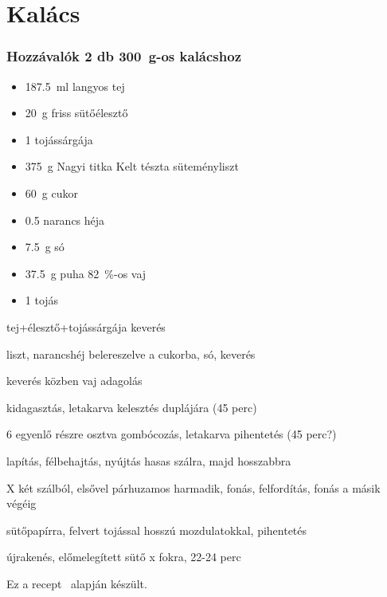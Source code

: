\newpage
\section{Kalács} \label{sec:kalacs}

\subsubsection*{Hozzávalók 2 db \qty{300}{\g}-os kalácshoz}
\begin{itemize}
    \item \qty{187.5}{\ml} langyos tej
    \item \qty{20}{\g} friss sütőélesztő
    \item \num{1} tojássárgája
    \item \qty{375}{\g} Nagyi titka Kelt tészta süteményliszt
    \item \qty{60}{\g} cukor
    \item \num{0.5} narancs héja
    \item \qty{7.5}{\g} só
    \item \qty{37.5}{\g} puha \qty{82}{\percent}-os vaj
    \item \num{1} tojás
\end{itemize}

tej+élesztő+tojássárgája keverés

liszt, narancshéj belereszelve a cukorba, só, keverés

keverés közben vaj adagolás

kidagasztás, letakarva kelesztés duplájára (45 perc)

6 egyenlő részre osztva gombócozás, letakarva pihentetés (45 perc?)

lapítás, félbehajtás, nyújtás hasas szálra, majd hosszabbra

X két szálból, elsővel párhuzamos harmadik, fonás, felfordítás, fonás a másik végéig

sütőpapírra, felvert tojással hosszú mozdulatokkal, pihentetés

újrakenés, előmelegített sütő x fokra, 22-24 perc



Ez a recept~\cite{szabi_kalacs} alapján készült.
